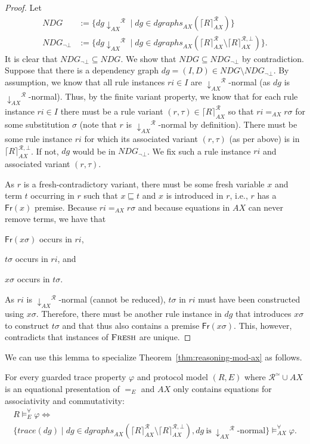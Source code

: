 \documentclass[envcountsame,orivec]{llncs}
\newcommand{\fact}[1]{\ensuremath{\mathsf{#1}}}
\newcommand{\trace}{\ensuremath{\mathit{trace}}}
\newcommand{\dgraphs}{\ensuremath{\mathit{dgraphs}}}
\newcommand{\R}{\ensuremath{\mathcal{R}}}
\newcommand{\RFresh}[0]{\ensuremath{\textnormal{\textsc{Fresh}}}}
\newcommand{\Fr}{\fact{Fr}}
\newcommand{\normf}{\ensuremath{{\downarrow}_{AX}}}
\newcommand{\variants}[1]{\ensuremath{\lceil #1 \rceil}_{AX}}
\newcommand{\tsat}[1]{\vDash_{#1}}
\newcommand{\tsatE}{\tsat{E}}
\begin{document}
\begin{proof}
  Let
  \begin{align*}
    NDG & := \{ dg\normf^\R \mid dg \in \dgraphs_{AX}(\variants{R}^\R) \} \\
    NDG_{\neg\bot} & := \{ dg\normf^\R \mid dg \in \dgraphs_{AX}(\variants{R}^\R \setminus \variants{R}^{\R,\bot})\}.
  \end{align*}
  It is clear that $NDG_{\neg\bot} \subseteq NDG$.
  We show that $NDG \subseteq NDG_{\neg\bot}$ by contradiction.
  Suppose that there is a dependency graph $dg = (I, D) \in NDG \setminus NDG_{\neg\bot}$.
  By assumption, we know that all rule instances $ri \in I$ are $\normf^\R$-normal (as $dg$ is $\normf^\R$-normal).
  Thus, by the finite variant property, we know that for each rule instance $ri \in I$ there must be a rule variant $(r, \tau) \in \variants{R}^\R$ so that $ri =_{AX} r\sigma$ for some substitution $\sigma$ (note that $r$ is $\normf^\R$-normal by definition).
  There must be some rule instance $ri$ for which its associated variant $(r, \tau)$ (as per above) is in $\variants{R}^{\R,\bot}$.
  If not, $dg$ would be in $NDG_{\neg\bot}$.
  We fix such a rule instance $ri$ and associated variant $(r, \tau)$.

  As $r$ is a fresh-contradictory variant, there must be some fresh variable $x$ and term $t$ occurring in $r$ such that $x \sqsubseteq t$ and $x$ is introduced in $r$, i.e., $r$ has a $\Fr(x)$ premise.
  Because $ri =_{AX} r\sigma$ and because equations in $AX$ can never remove terms, we have that \begin{enumerate*}[label=(\roman*)]
    \item $\Fr(x\sigma)$ occurs in $ri$,
    \item $t\sigma$ occurs in $ri$, and
    \item $x\sigma$ occurs in $t\sigma$.
  \end{enumerate*}
  As $ri$ is $\normf^\R$-normal (cannot be reduced), $t\sigma$ in $ri$ must have been constructed using $x\sigma$.
  Therefore, there must be another rule instance in $dg$ that introduces $x\sigma$ to construct $t\sigma$ and that thus also contains a premise $\Fr(x\sigma)$.
  This, however, contradicts that instances of $\RFresh$ are unique.
\end{proof}

We can use this lemma to specialize Theorem~\ref{thm:reasoning-mod-ax} as follows.

\begin{theorem} \label{thm:reasoning-mod-fresh}
    For every guarded trace property $\varphi$ and protocol model $(R, E)$ where $\R^\simeq \cup AX$ is an equational presentation of $=_E$ and $AX$ only contains equations for associativity and commutativity:
    \begin{multline*}
      R \tsatE^\forall \varphi \iff \\
        \{ \trace(dg) \mid dg \in \dgraphs_{AX}(\variants{R}^\R \setminus \variants{R}^{\R,\bot}), dg~\text{is}~\normf^\R\text{-normal} \} \tsat{AX}^\forall \varphi.
    \end{multline*}
\end{theorem}
\end{document}
